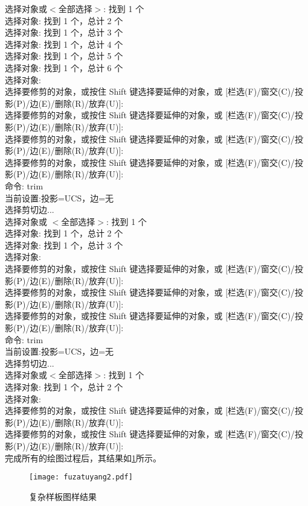 选择对象或$ <$全部选择$>$:  找到 1 个\\
选择对象: 找到 1 个，总计 2 个\\
选择对象: 找到 1 个，总计 3 个\\
选择对象: 找到 1 个，总计 4 个\\
选择对象: 找到 1 个，总计 5 个\\
选择对象: 找到 1 个，总计 6 个\\
选择对象:\\
选择要修剪的对象，或按住 Shift 键选择要延伸的对象，或
[栏选(F)/窗交(C)/投影(P)/边(E)/删除(R)/放弃(U)]:\\
选择要修剪的对象，或按住 Shift 键选择要延伸的对象，或
[栏选(F)/窗交(C)/投影(P)/边(E)/删除(R)/放弃(U)]:\\
选择要修剪的对象，或按住 Shift 键选择要延伸的对象，或
[栏选(F)/窗交(C)/投影(P)/边(E)/删除(R)/放弃(U)]:\\
选择要修剪的对象，或按住 Shift 键选择要延伸的对象，或
[栏选(F)/窗交(C)/投影(P)/边(E)/删除(R)/放弃(U)]:\\
命令: trim\\
当前设置:投影=UCS，边=无\\
选择剪切边...\\
选择对象或 $<$全部选择$>$:  找到 1 个\\
选择对象: 找到 1 个，总计 2 个\\
选择对象: 找到 1 个，总计 3 个\\
选择对象:\\
选择要修剪的对象，或按住 Shift 键选择要延伸的对象，或
[栏选(F)/窗交(C)/投影(P)/边(E)/删除(R)/放弃(U)]:\\
选择要修剪的对象，或按住 Shift 键选择要延伸的对象，或
[栏选(F)/窗交(C)/投影(P)/边(E)/删除(R)/放弃(U)]:\\
选择要修剪的对象，或按住 Shift 键选择要延伸的对象，或
[栏选(F)/窗交(C)/投影(P)/边(E)/删除(R)/放弃(U)]:\\
命令: trim\\
当前设置:投影=UCS，边=无\\
选择剪切边...\\
选择对象或$ <$全部选择$>$:  找到 1 个\\
选择对象: 找到 1 个，总计 2 个\\
选择对象:\\
选择要修剪的对象，或按住 Shift 键选择要延伸的对象，或
[栏选(F)/窗交(C)/投影(P)/边(E)/删除(R)/放弃(U)]:\\
选择要修剪的对象，或按住 Shift 键选择要延伸的对象，或
[栏选(F)/窗交(C)/投影(P)/边(E)/删除(R)/放弃(U)]:\\

\indent
完成所有的绘图过程后，其结果如\ref{fig:fuzatuyang2}所示。
\begin{figure}[htbp]
\centering
\texttt{[image: fuzatuyang2.pdf]}
\caption{复杂样板图样结果}\label{fig:fuzatuyang2}
\end{figure}
\endinput
